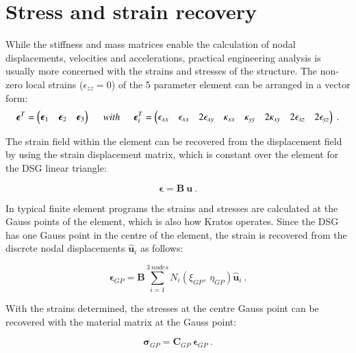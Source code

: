 \section{Stress and strain recovery}

While the stiffness and mass matrices enable the calculation of nodal displacements, velocities and accelerations, practical engineering analysis is usually more concerned with the strains and stresses of the structure. The non-zero local strains ($\epsilon_{zz} = 0$) of the 5 parameter element can be arranged in a vector form:
\begin{equation} 
\boldsymbol{\epsilon}^T = \begin{pmatrix}
\boldsymbol{\epsilon}_1 & \boldsymbol{\epsilon}_2 & \boldsymbol{\epsilon}_3
\end{pmatrix}
\hspace{5mm}
with
\hspace{5mm}
\boldsymbol{\epsilon}^T_i = \begin{pmatrix}
\epsilon_{xx} & \epsilon_{xx} & 2\epsilon_{xy} & \kappa_{xx} & \kappa_{yy} & 2\kappa_{xy} & 2\epsilon_{xz} & 2\epsilon_{yz}
\end{pmatrix}
\label{eqt18}\ .
\end{equation}

The strain field within the element can be recovered from the displacement field by using the strain displacement matrix, which is constant over the element for the DSG linear triangle:

\begin{equation} 
\boldsymbol{\epsilon} = \mathbf{B}\ \mathbf{u}
\label{eqt19}\ .
\end{equation}

In typical finite element programs the strains and stresses are calculated at the Gauss points of the element, which is also how Kratos operates. Since the DSG has one Gauss point in the centre of the element, the strain is recovered from the discrete nodal displacements $\hat{\mathbf{u}}_i$ as follows:

\begin{equation} 
\boldsymbol{\epsilon}_{GP} = \mathbf{B} \sum_{i=1}^{3\ nodes} N_i(\xi_{GP},\ \eta_{GP}) \hat{\mathbf{u}}_i
\label{eqt20}\ .
\end{equation}

With the strains determined, the stresses at the centre Gauss point can be recovered with the material matrix at the Gauss point:

\begin{equation} 
\boldsymbol{\sigma}_{GP} = \mathbf{C}_{GP}\ \boldsymbol{\epsilon}_{GP}
\label{eqt21}\ .
\end{equation}

